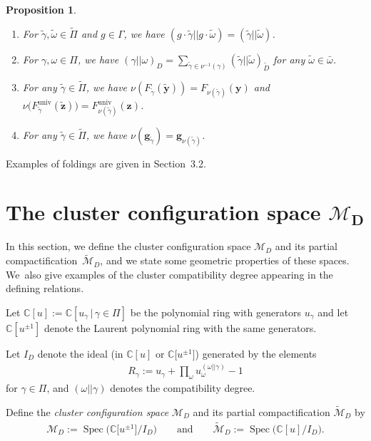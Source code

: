 \documentclass[pdftex]{sigma}%
\def\C{{\mathbb C}}
\def\Spec{\operatorname{Spec}}
\def\univ{{\operatorname{univ}}}
\def\M{{\mathcal{M}}}
\def\tM{{\widetilde {\mathcal{M}}}}
\def\tD{{\tilde D}}
\def\z{{\mathbf z}}
\def\y{{\mathbf y}}
\def\g{{\mathbf g}}
\def\tgamma{{\tilde \gamma}}
\def\tPi{{\tilde \Pi}}
\numberwithin{equation}{section}
\newtheorem{Proposition}[Theorem]{Proposition}
\begin{document}
\begin{Proposition} \label{prop:folding}\
\begin{enumerate}\itemsep=0pt
\item[$1.$] For $\tgamma,\tilde \omega \in \tPi$ and $g\in \Gamma$, we have $(g \cdot \tgamma||g \cdot \tilde \omega) = (\tgamma||\tilde \omega)$.
\item[$2.$] For $\gamma,\omega \in \Pi$, we have $(\gamma || \omega)_D = \sum_{\tgamma \in \nu^{-1}(\gamma) } (\tgamma || \tilde \omega)_{\tD}$ for any $\tilde \omega \in \bar \omega$.
\item[$3.$] For any $\tgamma \in \tPi$, we have $\nu(F_{\tgamma}(\tilde \y)) = F_{\nu(\tgamma)}(\y)$ and $\nu\big(F^\univ_{\tgamma}(\tilde \z)\big) = F^\univ_{\nu(\tgamma)}(\z)$.
\item[$4.$] For any $\tgamma \in \tPi$, we have $\nu(\g_{\tgamma}) = \g_{\nu(\tgamma)}$.
\end{enumerate}
\end{Proposition}
Examples of foldings are given in Section~3.2.

\section[The cluster configuration space MD]{The cluster configuration space $\boldsymbol{\M_D}$}
In this section, we define the cluster configuration space $\M_D$ and its partial compactification~$\tM_D$, and we state some geometric properties of these spaces. We~also give examples of the cluster compatibility degree appearing in the defining relations.

\bigskip{}
Let $\C[u]:=\C[u_\gamma \,|\, \gamma \in\Pi]$ be the polynomial ring with generators $u_\gamma$ and let $\C[u^{\pm 1}]$ denote the Laurent polynomial ring with the same generators.
\begin{Definition}\label{def:ID}
Let $I_D$ denote the ideal \big(in $\C[u]$ or $\C\big[u^{\pm 1}\big]$\big) generated by the elements
\begin{gather}\label{eq:I}
R_\gamma := u_\gamma + \prod_{\omega} u_{\omega}^{(\omega||\gamma)} - 1
\end{gather}
for $\gamma \in \Pi$, and $(\omega||\gamma)$ denotes the compatibility degree.
\end{Definition}

\begin{Definition}
Define the \emph{cluster configuration space} $\M_D$ and its partial compactification $\tM_D$ by
\begin{gather*}
\M_D := \Spec\big(\C\big[u^{\pm 1}\big]/I_D\big) \qquad \text{and} \qquad
\tM_D:=\Spec\big(\C[u]/I_D\big).
\end{gather*}
\end{Definition}
\end{document}

